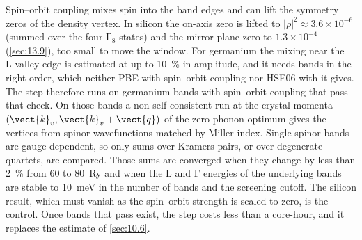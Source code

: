 Spin--orbit coupling mixes spin into the band edges and can lift the symmetry zeros of the density vertex. In silicon the on-axis zero is lifted to $|\rho|^2 \approx 3.6\times10^{-6}$ (summed over the four $\mathrm{\Gamma}_8$ states) and the mirror-plane zero to $1.3\times10^{-4}$ (\cref{sec:13.9}), too small to move the window. For germanium the mixing near the L-valley edge is estimated at up to \SI{10}{\percent} in amplitude, and it needs bands in the right order, which neither PBE with spin--orbit coupling nor HSE06 with it gives. The step therefore runs on germanium bands with spin--orbit coupling that pass that check. On those bands a non-self-consistent run at the crystal momenta $(\vect{k}_v, \vect{k}_v+\vect{q})$ of the zero-phonon optimum gives the vertices from spinor wavefunctions matched by Miller index. Single spinor bands are gauge dependent, so only sums over Kramers pairs, or over degenerate quartets, are compared. Those sums are converged when they change by less than \SI{2}{\percent} from 60 to \SI{80}{Ry} and when the L and $\mathrm{\Gamma}$ energies of the underlying bands are stable to \SI{10}{meV} in the number of bands and the screening cutoff. The silicon result, which must vanish as the spin--orbit strength is scaled to zero, is the control. Once bands that pass exist, the step costs less than a core-hour, and it replaces the estimate of \cref{sec:10.6}.
